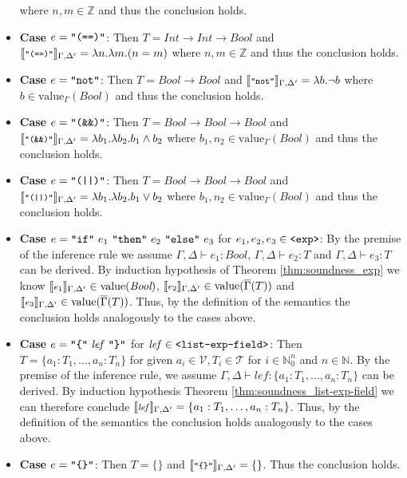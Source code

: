 \documentclass[]{scrbook}
\newcommand{\mf}[1]{\text{\texttt{#1}}}
\newcommand{\semantic}[1]{\llbracket \text{\footnotesize\texttt{#1}} \rrbracket}
\theoremstyle{definition}
\theoremstyle{definition}
\theoremstyle{definition}
\theoremstyle{remark}
\begin{document}
\begin{itemize}
where $n,m\in\mathbb{Z}$ and thus the conclusion holds.
\item\textbf{Case} $e = \mf{"(==)"}$: Then $T = \textit{Int}\to\textit{Int}\to\textit{Bool}$ and \(\semantic{"(==)"}_{\Gamma,\Delta'} = \lambda n.\lambda m. (n = m)\)
where $n,m\in\mathbb{Z}$ and thus the conclusion holds.
\item\textbf{Case} $e = \mf{"not"}$: Then $T = \textit{Bool}\to\textit{Bool}$ and
\(\semantic{"not"}_{\Gamma,\Delta'} = \lambda b. \neg b\) where $b\in\text{value}_\Gamma(\mathit{Bool})$ and thus the conclusion holds.
\item\textbf{Case} $e = \mf{"(\&\&)"}$: Then $T = \textit{Bool}\to\textit{Bool}\to\textit{Bool}$ and
\(\semantic{"(\&\&)"}_{\Gamma,\Delta'} = \lambda b_1.\lambda b_2. b_1 \land b_2\) where $b_1,n_2\in\text{value}_\Gamma(\mathit{Bool})$ and thus the conclusion holds.
\item\textbf{Case} $e = \mf{"(||)"}$: Then $T = \textit{Bool}\to\textit{Bool}\to\textit{Bool}$ and
\(\semantic{"(||)"}_{\Gamma,\Delta'} = \lambda b_1.\lambda b_2. b_1 \lor b_2\) where $b_1,n_2\in\text{value}_\Gamma(\mathit{Bool})$ and thus the conclusion holds.
\item\textbf{Case} $e = \mf{"if"} \ e_1 \ \mf{"then"} \ e_2 \ \mf{"else"} \ e_3$ for $e_1,e_2,e_3\in\mf{<exp>}$: By the premise of the inference rule we assume $\Gamma,\Delta\vdash e_1:\textit{Bool}$, $\Gamma,\Delta\vdash e_2: T$ and $\Gamma,\Delta\vdash e_3: T$ can be derived. By induction hypothesis of Theorem \ref{thm:soundness_exp} we know \(\semantic{$e_1$}_{\Gamma,\Delta'} \in \text{value}(\textit{Bool})\), \(\semantic{$e_2$}_{\Gamma,\Delta'} \in \text{value}(\overline{\Gamma}(T))\) and \(\semantic{$e_3$}_{\Gamma,\Delta'} \in \text{value}(\overline{\Gamma}(T))\). Thus, by the definition of the semantics the conclusion holds analogously to the cases above.
\item\textbf{Case} $e = \mf{"\{"} \ \mathit{lef} \ \mf{"\}"}$ for $\mathit{lef}\in\mf{<list-exp-field>}$: Then $T=\{a_1:T_1,\dots,a_n:T_n\}$ for given $a_i\in\mathcal{V},T_i\in\mathcal{T}$ for $i\in\mathbb{N}_0^n$ and $n\in\mathbb{N}$. By the premise of the inference rule, we assume $\Gamma,\Delta\vdash \mathit{lef}:\{a_1:T_1,\dots, a_n:T_n\}$ can be derived. By induction hypothesis Theorem \ref{thm:soundness_list-exp-field} we can  therefore conclude \(\semantic{$\mathit{lef}$}_{\Gamma,\Delta'}=\{a_1:T_1,\dots,a_n:T_n\}\). Thus, by the definition of the semantics the conclusion holds analogously to the cases above.
\item\textbf{Case} $e = \mf{"\{\}"}$: Then $T=\{\}$ and \(\semantic{$\mf{"\{\}"}$}_{\Gamma,\Delta'}=\{\}\). Thus the conclusion holds.

\end{itemize}
\end{document}
